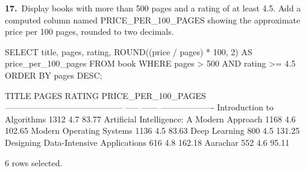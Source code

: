 \noindent\begin{minipage}{\linewidth}
\begingroup{}
{\fontsize{14}{17}\selectfont\textbf{17.}}\ Display books with more than 500 pages and a rating of at least 4.5. Add a computed column named PRICE\_PER\_100\_PAGES showing the approximate price per 100 pages, rounded to two decimals.\par
\endgroup\vspace{12pt}


\begin{sqlcode}
SELECT title, pages, rating,
       ROUND((price / pages) * 100, 2) AS price_per_100_pages
FROM book
WHERE pages > 500
  AND rating >= 4.5
ORDER BY pages DESC;
\end{sqlcode}

\vspace{18pt}


\begin{sqlout}[fontsize=\small]
TITLE                                       PAGES  RATING  PRICE_PER_100_PAGES
------------------------------------------  -----  ------  -------------------
Introduction to Algorithms                   1312     4.7                83.77
Artificial Intelligence: A Modern Approach   1168     4.6               102.65
Modern Operating Systems                     1136     4.5                83.63
Deep Learning                                 800     4.5               131.25
Designing Data-Intensive Applications         616     4.8               162.18
Aarachar                                      552     4.6                95.11

6 rows selected.
\end{sqlout}
\end{minipage}\par\vspace{24pt}

